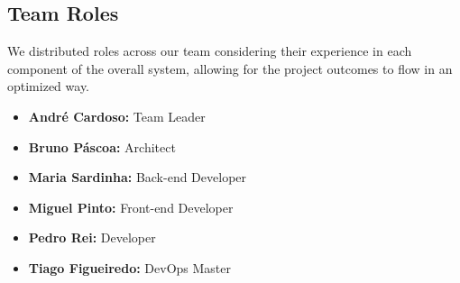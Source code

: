 \documentclass[a4paper,11pt]{article}
\begin{document}
        \subsection{Team Roles}
            \quad We distributed roles across our team considering their experience in each component of the overall system, allowing for the project outcomes to flow in an optimized way.
            \begin{itemize}
                \item \textbf{André Cardoso:} Team Leader 
                \item \textbf{Bruno Páscoa:} Architect 
                \item \textbf{Maria Sardinha:} Back-end Developer 
                \item \textbf{Miguel Pinto:} Front-end Developer 
                \item \textbf{Pedro Rei:} Developer 
                \item \textbf{Tiago Figueiredo:} DevOps Master 
            \end{itemize}
                
\end{document}
